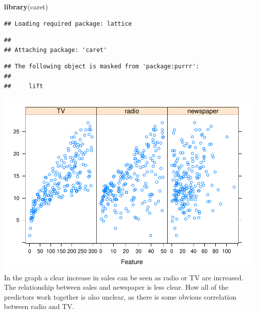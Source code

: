 \documentclass[]{report}
\newenvironment{Shaded}{\begin{snugshade}}{\end{snugshade}}
\newcommand{\KeywordTok}[1]{\textcolor[rgb]{0.13,0.29,0.53}{\textbf{#1}}}
\newcommand{\DataTypeTok}[1]{\textcolor[rgb]{0.13,0.29,0.53}{#1}}
\newcommand{\StringTok}[1]{\textcolor[rgb]{0.31,0.60,0.02}{#1}}
\newcommand{\OperatorTok}[1]{\textcolor[rgb]{0.81,0.36,0.00}{\textbf{#1}}}
\newcommand{\NormalTok}[1]{#1}
\begin{document}
\begin{Shaded}
\begin{Highlighting}[]
\KeywordTok{library}\NormalTok{(caret)}
\end{Highlighting}
\end{Shaded}

\begin{verbatim}
## Loading required package: lattice
\end{verbatim}

\begin{verbatim}
## 
## Attaching package: 'caret'
\end{verbatim}

\begin{verbatim}
## The following object is masked from 'package:purrr':
## 
##     lift
\end{verbatim}

\begin{Shaded}
\end{Shaded}

\includegraphics{MyBook_files/figure-latex/unnamed-chunk-73-1.pdf} In
the graph a clear increase in sales can be seen as radio or TV are
increased. The relationship between sales and newspaper is less clear.
How all of the predictors work together is also unclear, as there is
some obvious correlation between radio and TV.
\end{document}
